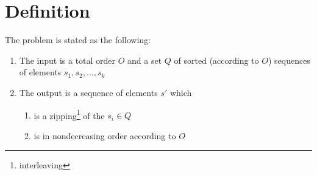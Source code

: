 \section{Definition}
\label{tree:merging:def}

The problem is stated as the following:

\begin{enumerate}
\item The input is a total order $O$ and a set $Q$ of sorted (according to $O$) sequences of elements ${s_1, s_2, \dots, s_k}$
\item The output is a sequence of elements $s'$ which
	\begin{enumerate}
	\item is a zipping\footnote{interleaving} of the $s_i \in Q$
	\item is in nondecreasing order according to $O$
	\end{enumerate}
\end{enumerate}

